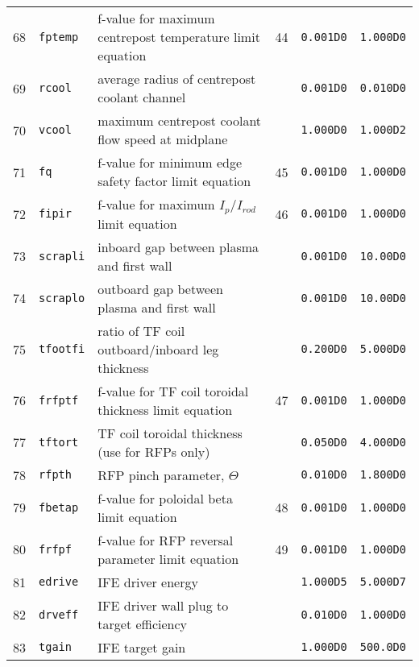 \documentclass[11pt,a4paper]{report}
\begin{document}
\begin{table}[tbph]
\begin{center}
\begin{tabular}{||c|l|l|c|c|c||}
68  & \texttt{fptemp}   & f-value for maximum centrepost temperature limit equation & 44  & \texttt{0.001D0} & \texttt{1.000D0} \\
69  & \texttt{rcool}    & average radius of centrepost coolant channel            &     & \texttt{0.001D0} & \texttt{0.010D0} \\
70  & \texttt{vcool}    & maximum centrepost coolant flow speed at midplane       &     & \texttt{1.000D0} & \texttt{1.000D2} \\
71  & \texttt{fq}       & f-value for minimum edge safety factor limit equation   & 45  & \texttt{0.001D0} & \texttt{1.000D0} \\
72  & \texttt{fipir}    & f-value for maximum $I_p/I_{rod}$ limit equation         & 46  & \texttt{0.001D0} & \texttt{1.000D0} \\
73  & \texttt{scrapli}  & inboard gap between plasma and first wall               &     & \texttt{0.001D0} & \texttt{10.00D0} \\
74  & \texttt{scraplo}  & outboard gap between plasma and first wall              &     & \texttt{0.001D0} & \texttt{10.00D0} \\
75  & \texttt{tfootfi}  & ratio of TF coil outboard/inboard leg thickness         &     & \texttt{0.200D0} & \texttt{5.000D0} \\
76  & \texttt{frfptf}   & f-value for TF coil toroidal thickness limit equation   & 47  & \texttt{0.001D0} & \texttt{1.000D0} \\
77  & \texttt{tftort}   & TF coil toroidal thickness (use for RFPs only)          &     & \texttt{0.050D0} & \texttt{4.000D0} \\
78  & \texttt{rfpth}    & RFP pinch parameter, $\Theta$                           &     & \texttt{0.010D0} & \texttt{1.800D0} \\
79  & \texttt{fbetap}   & f-value for poloidal beta limit equation                & 48  & \texttt{0.001D0} & \texttt{1.000D0} \\
80  & \texttt{frfpf}    & f-value for RFP reversal parameter limit equation       & 49  & \texttt{0.001D0} & \texttt{1.000D0} \\
81  & \texttt{edrive}   & IFE driver energy                                       &     & \texttt{1.000D5} & \texttt{5.000D7} \\
82  & \texttt{drveff}   & IFE driver wall plug to target efficiency               &     & \texttt{0.010D0} & \texttt{1.000D0} \\
83  & \texttt{tgain}    & IFE target gain                                         &     & \texttt{1.000D0} & \texttt{500.0D0} \\

\end{tabular}
\end{center}
\end{table}
\end{document}
